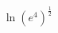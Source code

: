 \documentclass[preview]{standalone}
\begin{document}
\begin{align*}
\ln  (e{^4}) ^ {\frac{1}{2} }
\end{align*}
\end{document}
